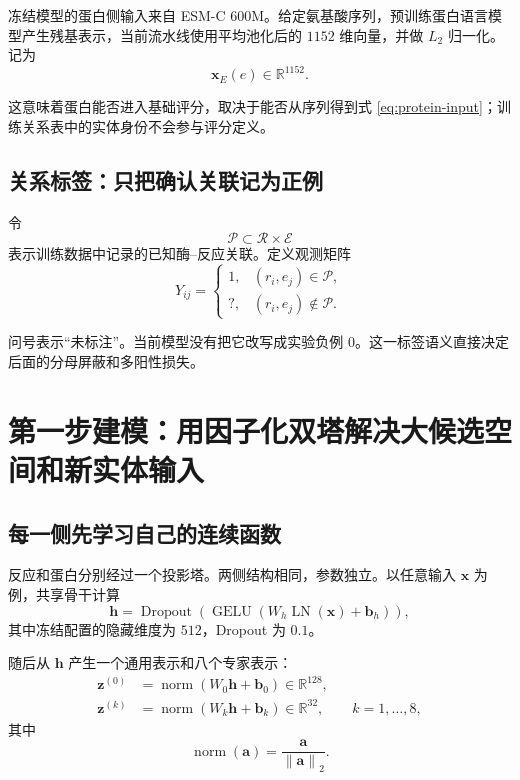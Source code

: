 \documentclass[UTF8,11pt,a4paper]{ctexart}
\newcommand{\Rset}{\mathcal R}
\newcommand{\Eset}{\mathcal E}
\newcommand{\Pset}{\mathcal P}
\newcommand{\normtwo}[1]{\left\lVert #1\right\rVert_2}
\begin{document}
冻结模型的蛋白侧输入来自 ESM-C 600M。给定氨基酸序列，预训练蛋白语言模型产生残基表示，当前流水线使用平均池化后的 $1152$ 维向量，并做 $L_2$ 归一化。记为
\begin{equation}
\bm x_E(e)\in\mathbb R^{1152}.
\label{eq:protein-input}
\end{equation}

这意味着蛋白能否进入基础评分，取决于能否从序列得到式 \eqref{eq:protein-input}；训练关系表中的实体身份不会参与评分定义。

\subsection{关系标签：只把确认关联记为正例}

令
\begin{equation}
\Pset\subset\Rset\times\Eset
\end{equation}
表示训练数据中记录的已知酶--反应关联。定义观测矩阵
\begin{equation}
Y_{ij}=
\begin{cases}
1, & (r_i,e_j)\in\Pset,\\
?, & (r_i,e_j)\notin\Pset.
\end{cases}
\label{eq:pu-label}
\end{equation}

问号表示“未标注”。当前模型没有把它改写成实验负例 $0$。这一标签语义直接决定后面的分母屏蔽和多阳性损失。

\section{第一步建模：用因子化双塔解决大候选空间和新实体输入}

\subsection{每一侧先学习自己的连续函数}

反应和蛋白分别经过一个投影塔。两侧结构相同，参数独立。以任意输入 $\bm x$ 为例，共享骨干计算
\begin{equation}
\bm h
=
\operatorname{Dropout}
\left(
\operatorname{GELU}
\left(W_h\operatorname{LN}(\bm x)+\bm b_h\right)
\right),
\label{eq:backbone}
\end{equation}
其中冻结配置的隐藏维度为 $512$，Dropout 为 $0.1$。

随后从 $\bm h$ 产生一个通用表示和八个专家表示：
\begin{align}
\bm z^{(0)} &= \operatorname{norm}(W_0\bm h+\bm b_0)
\in\mathbb R^{128},\\
\bm z^{(k)} &= \operatorname{norm}(W_k\bm h+\bm b_k)
\in\mathbb R^{32},\qquad k=1,\ldots,8,
\label{eq:embeddings}
\end{align}
其中
\begin{equation}
\operatorname{norm}(\bm a)=\frac{\bm a}{\normtwo{\bm a}}.
\end{equation}
\end{document}
